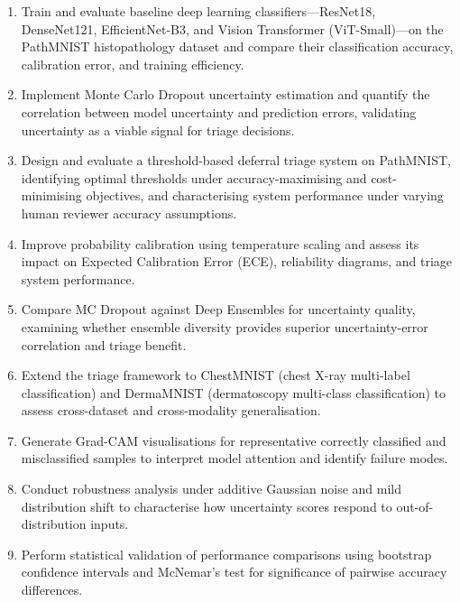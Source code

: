 \begin{enumerate}
    \item Train and evaluate baseline deep learning classifiers—ResNet18, DenseNet121, EfficientNet-B3, and Vision Transformer (ViT-Small)—on the PathMNIST histopathology dataset and compare their classification accuracy, calibration error, and training efficiency.

    \item Implement Monte Carlo Dropout uncertainty estimation and quantify the correlation between model uncertainty and prediction errors, validating uncertainty as a viable signal for triage decisions.

    \item Design and evaluate a threshold-based deferral triage system on PathMNIST, identifying optimal thresholds under accuracy-maximising and cost-minimising objectives, and characterising system performance under varying human reviewer accuracy assumptions.

    \item Improve probability calibration using temperature scaling and assess its impact on Expected Calibration Error (ECE), reliability diagrams, and triage system performance.

    \item Compare MC Dropout against Deep Ensembles for uncertainty quality, examining whether ensemble diversity provides superior uncertainty-error correlation and triage benefit.

    \item Extend the triage framework to ChestMNIST (chest X-ray multi-label classification) and DermaMNIST (dermatoscopy multi-class classification) to assess cross-dataset and cross-modality generalisation.

    \item Generate Grad-CAM visualisations for representative correctly classified and misclassified samples to interpret model attention and identify failure modes.

    \item Conduct robustness analysis under additive Gaussian noise and mild distribution shift to characterise how uncertainty scores respond to out-of-distribution inputs.

    \item Perform statistical validation of performance comparisons using bootstrap confidence intervals and McNemar's test for significance of pairwise accuracy differences.
\end{enumerate}

